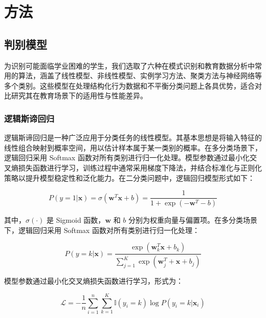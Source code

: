 \documentclass[a4paper, utf8]{ctexart}
\begin{document}
	\section{方法}
	
	\subsection{判别模型}
	
	为识别可能面临学业困难的学生，我们选取了六种在模式识别和教育数据分析中常用的算法，涵盖了线性模型、非线性模型、实例学习方法、聚类方法与神经网络等多个类别。这些模型在处理结构化行为数据和不平衡分类问题上各具优势，适合对比研究其在教育场景下的适用性与性能差异\cite{ref5,ref16,ref19}。
	
	\subsubsection{逻辑斯谛回归}
	
	逻辑斯谛回归是一种广泛应用于分类任务的线性模型。其基本思想是将输入特征的线性组合映射到概率空间，用以估计样本属于某一类别的概率\cite{ref3,ref13,ref26}。在多分类场景下，逻辑回归采用 Softmax 函数对所有类别进行归一化处理。模型参数通过最小化交叉熵损失函数进行学习，训练过程中通常采用梯度下降法，并结合标准化与正则化策略以提升模型稳定性和泛化能力。在二分类问题中，逻辑回归模型形式如下：
	
	\vspace{-.5em}
	\begin{equation}
		P(y=1|\mathbf{x})=\sigma(\mathbf{w}^T\mathbf{x}+b)=\frac{1}{1+\exp(-\mathbf{w}^T-b)}
	\end{equation}
	
	其中，$\sigma(\cdot)$ 是 Sigmoid 函数，$\mathbf{w}$ 和 $b$ 分别为权重向量与偏置项。在多分类场景下，逻辑回归采用 Softmax 函数对所有类别进行归一化处理：
	
	\vspace{-.5em}
	\begin{equation}
		P(y=k|\mathbf{x})=\frac{\exp(\mathbf{w}^T_k\mathbf{x}+b_k)}{\sum^{K}_{j=1}\exp(\mathbf{w}_j^T+\mathbf{x}+b_j)}
	\end{equation}
	
	模型参数通过最小化交叉熵损失函数进行学习，形式为：
	
	\vspace{-.5em}
	\begin{equation}
		\mathcal{L}=-\frac{1}{n}\sum^n_{i=1}\sum^{K}_{k=1}\mathbb{I}(y_i=k)\log P(y_i=k|\mathbf{x}_i)
	\end{equation}
	
\end{document}
